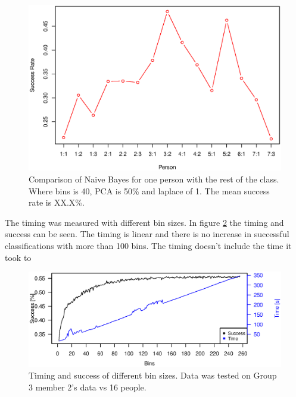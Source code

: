 \begin{figure}[H]
\centering
\includegraphics[width = \textwidth]{graphics/graph_baye_comparison}
\caption{Comparison of Naive Bayes for one person with the rest of the class.
Where bins is 40, PCA is 50\% and laplace of 1. The mean success rate is XX.X\%.}
\label{fig:comp_naiveBayes}
\end{figure}

The timing was measured with different bin sizes. 
In figure \ref{fig:baye_timing} the timing and success can be seen.
The timing is linear and there is no increase in successful classifications with more than 100 bins. 
The timing doesn't include the time it took to 

\begin{figure}
\centering
\includegraphics[width = \textwidth]{graphics/baye_timing_bins}
\caption[Timing with different bin sizes]{Timing and success of different bin sizes. Data was tested on Group 3 member 2's data vs 16 people.}
\label{fig:baye_timing}
\end{figure}
